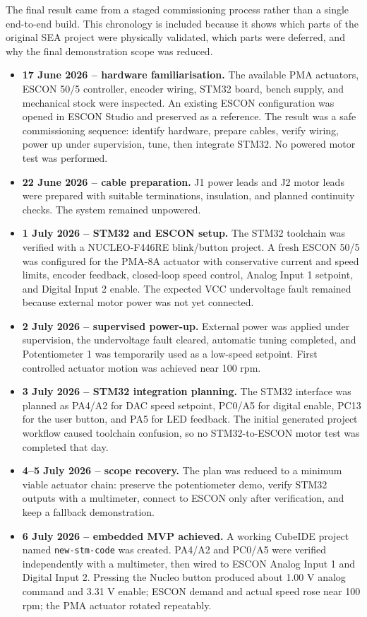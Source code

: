 \documentclass[11pt,a4paper]{report}
\begin{document}
The final result came from a staged commissioning process rather than a single end-to-end build. This chronology is included because it shows which parts of the original SEA project were physically validated, which parts were deferred, and why the final demonstration scope was reduced.

\begin{itemize}
  \item \textbf{17 June 2026 -- hardware familiarisation.} The available PMA actuators, ESCON 50/5 controller, encoder wiring, STM32 board, bench supply, and mechanical stock were inspected. An existing ESCON configuration was opened in ESCON Studio and preserved as a reference. The result was a safe commissioning sequence: identify hardware, prepare cables, verify wiring, power up under supervision, tune, then integrate STM32. No powered motor test was performed.
  \item \textbf{22 June 2026 -- cable preparation.} J1 power leads and J2 motor leads were prepared with suitable terminations, insulation, and planned continuity checks. The system remained unpowered.
  \item \textbf{1 July 2026 -- STM32 and ESCON setup.} The STM32 toolchain was verified with a NUCLEO-F446RE blink/button project. A fresh ESCON 50/5 was configured for the PMA-8A actuator with conservative current and speed limits, encoder feedback, closed-loop speed control, Analog Input 1 setpoint, and Digital Input 2 enable. The expected VCC undervoltage fault remained because external motor power was not yet connected.
  \item \textbf{2 July 2026 -- supervised power-up.} External power was applied under supervision, the undervoltage fault cleared, automatic tuning completed, and Potentiometer 1 was temporarily used as a low-speed setpoint. First controlled actuator motion was achieved near 100 rpm.
  \item \textbf{3 July 2026 -- STM32 integration planning.} The STM32 interface was planned as PA4/A2 for DAC speed setpoint, PC0/A5 for digital enable, PC13 for the user button, and PA5 for LED feedback. The initial generated project workflow caused toolchain confusion, so no STM32-to-ESCON motor test was completed that day.
  \item \textbf{4--5 July 2026 -- scope recovery.} The plan was reduced to a minimum viable actuator chain: preserve the potentiometer demo, verify STM32 outputs with a multimeter, connect to ESCON only after verification, and keep a fallback demonstration.
  \item \textbf{6 July 2026 -- embedded MVP achieved.} A working CubeIDE project named \texttt{new-stm-code} was created. PA4/A2 and PC0/A5 were verified independently with a multimeter, then wired to ESCON Analog Input 1 and Digital Input 2. Pressing the Nucleo button produced about 1.00 V analog command and 3.31 V enable; ESCON demand and actual speed rose near 100 rpm; the PMA actuator rotated repeatably.

\end{itemize}
\end{document}
